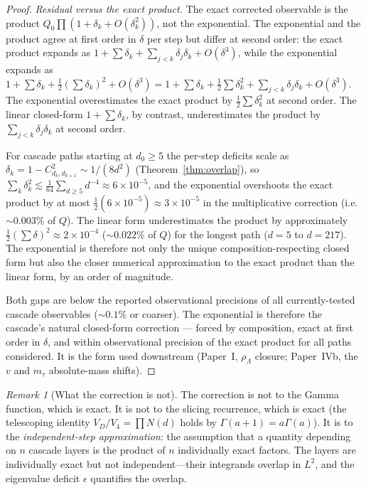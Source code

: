 \documentclass[12pt,a4paper]{article}
\theoremstyle{remark}
\newtheorem*{remark}{Remark}
\begin{document}
\begin{proof}
\emph{Residual versus the exact product.} The exact corrected
observable is the product $Q_0\prod(1 + \delta_k + O(\delta_k^2))$, not
the exponential. The exponential and the product agree at first order
in $\delta$ per step but differ at second order: the exact product
expands as $1 + \sum\delta_k + \sum_{j<k}\delta_j\delta_k + O(\delta^3)$,
while the exponential expands as $1 + \sum\delta_k + \tfrac{1}{2}(\sum\delta_k)^2 + O(\delta^3)
= 1 + \sum\delta_k + \tfrac{1}{2}\sum\delta_k^2 + \sum_{j<k}\delta_j\delta_k + O(\delta^3)$.
The exponential overestimates the exact product by
$\tfrac{1}{2}\sum\delta_k^2$ at second order. The linear closed-form
$1 + \sum\delta_k$, by contrast, underestimates the product by
$\sum_{j<k}\delta_j\delta_k$ at second order.

For cascade paths starting at $d_0\geq 5$ the per-step deficits scale
as $\delta_k = 1 - C^2_{d_k,d_{k+1}} \sim 1/(8d^2)$
(Theorem~\ref{thm:overlap}), so
$\sum_{k}\delta_k^2 \lesssim \tfrac{1}{64}\sum_{d\geq 5} d^{-4} \approx
6\times 10^{-5}$, and the exponential overshoots the exact product by
at most $\tfrac{1}{2}(6\times 10^{-5}) \approx 3\times 10^{-5}$ in the
multiplicative correction (i.e.\ $\sim 0.003\%$ of $Q$). The linear
form underestimates the product by approximately
$\tfrac{1}{2}(\sum\delta)^2 \approx 2\times 10^{-4}$ ($\sim 0.022\%$
of $Q$) for the longest path ($d=5$ to $d=217$). The exponential is
therefore not only the unique composition-respecting closed form but
also the closer numerical approximation to the exact product than the
linear form, by an order of magnitude.

Both gaps are below the reported observational precisions of all
currently-tested cascade observables ($\sim 0.1\%$ or coarser). The
exponential is therefore the cascade's natural closed-form correction
--- forced by composition, exact at first order in $\delta$, and within
observational precision of the exact product for all paths considered.
It is the form used downstream (Paper~I, $\rho_\Lambda$ closure;
Paper~IVb, the $v$ and $m_\tau$ absolute-mass shifts).
\end{proof}

\begin{remark}[What the correction is not]
The correction is not to the Gamma function, which is exact. It is not to the slicing recurrence, which is exact (the telescoping identity $V_D/V_4 = \prod N(d)$ holds by $\Gamma(a+1) = a\Gamma(a)$). It is to the \emph{independent-step approximation}: the assumption that a quantity depending on $n$ cascade layers is the product of $n$ individually exact factors. The layers are individually exact but not independent---their integrands overlap in $L^2$, and the eigenvalue deficit $\epsilon$ quantifies the overlap.
\end{remark}
\end{document}
